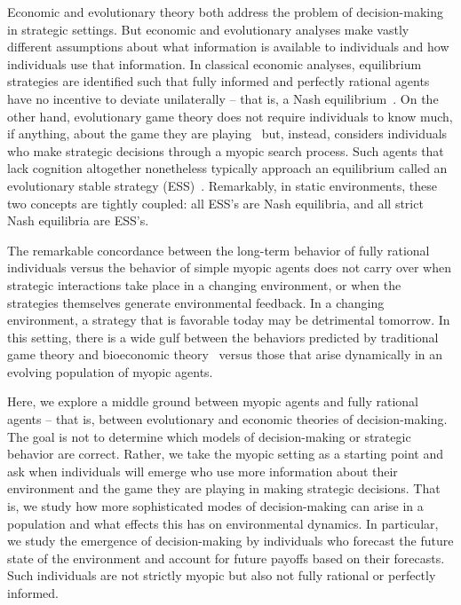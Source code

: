 \documentclass{article}
\begin{document}
Economic and evolutionary theory both address the problem of decision-making in strategic settings. But economic and evolutionary analyses make vastly different assumptions about what information is available to individuals and how individuals use that information. In classical economic analyses, equilibrium strategies are identified such that fully informed and perfectly rational agents have no incentive to deviate unilaterally -- that is, a Nash equilibrium~\citep{nash1950}. On the other hand, evolutionary game theory does not require individuals to know much, if anything, about the game they are playing~\citep{maynardsmith} but, instead, considers individuals who make strategic decisions through a myopic search process. Such agents that lack cognition altogether nonetheless typically approach an equilibrium called an evolutionary stable strategy (ESS)~\citep{maynardsmith}. Remarkably, in static environments, these two concepts are tightly coupled: all ESS's are Nash equilibria, and all strict Nash equilibria are ESS's. 

The remarkable concordance between the long-term behavior of fully rational individuals versus the behavior of simple myopic agents does not carry over when strategic interactions take place in a changing environment, or when the strategies themselves generate environmental feedback. In a changing environment, a strategy that is favorable today may be detrimental tomorrow. In this setting, there is a wide gulf between the behaviors predicted by traditional game theory and bioeconomic theory~\citep{clark} versus those that arise dynamically in an evolving population of myopic agents. 

Here, we explore a middle ground between myopic agents and fully rational agents -- that is, between evolutionary and economic theories of decision-making. The goal is not to determine which models of decision-making or strategic behavior are correct. Rather, we take the myopic setting as a starting point and ask when individuals will emerge who use more information about their environment and the game they are playing in making strategic decisions. That is, we study how more sophisticated modes of decision-making can arise in a population and what effects this has on environmental dynamics. In particular, we study the emergence of decision-making by individuals who forecast the future state of the environment and account for future payoffs based on their forecasts. Such individuals are not strictly myopic but also not fully rational or perfectly informed. 
\end{document}
